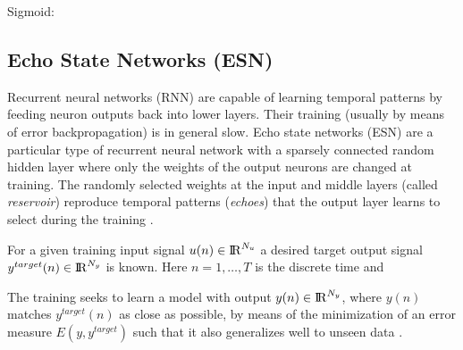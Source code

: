 
Sigmoid:




\subsection{Echo State Networks (ESN)}

Recurrent neural networks (RNN) are capable of learning temporal
patterns by feeding neuron outputs back into lower layers. Their
training (usually by means of error backpropagation) is in general
slow.
%
Echo state networks (ESN) are a particular type of recurrent neural
network with a sparsely connected random hidden layer where only the
weights of the output neurons are changed at training.  The randomly
selected weights at the input and middle layers (called \emph{reservoir})
reproduce temporal patterns (\emph{echoes}) that the output layer
learns to select during the training \citep{Lukose2009}.

For a given training input signal $u(n) \in \mathrm{I\negthinspace R}^{N_u}$ a desired target
output signal $y^{target}(n) \in \mathrm{I\negthinspace R}^{N_y}$ is known.
%
Here $n = 1,\ldots,T$ is the discrete time and 

The training seeks to learn a model with output $y(n) \in
\mathrm{I\negthinspace R}^{N_y}$, where $y(n)$ matches $y^{target}(n)$ as close as
possible, by means of the minimization of an error measure
$E(y,y^{target})$ such that it also generalizes well to unseen data
\citep{Lukose2012}.
